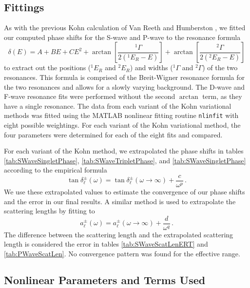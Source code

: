 \documentclass[preprint,showpacs,preprintnumbers,amsmath,amssymb]{revtex4}
\begin{document}
\subsection{Fittings}
As with the previous Kohn calculation of Van Reeth and Humberston \cite{VanReeth2004}, we fitted our computed phase shifts for the S-wave and P-wave to the resonance formula
\begin{equation}
\label{eq:ResonanceFit}
\delta(E) = A + B E + C E^2 + \arctan \left[ \frac{^1\Gamma}{2(^1E_R - E)} \right] + \arctan \left[ \frac{^2\Gamma}{2(^2E_R - E)} \right]
\end{equation}
to extract out the positions ($^1E_R$ and $^2E_R$) and widths
($^1\Gamma$ and $^2\Gamma$) of the two resonances. 
This formula is comprised of the Breit-Wigner resonance
formula for the two resonances and allows for a slowly varying
background. The D-wave and F-wave resonance fits were performed without the second $\arctan$ term, as they have a single resonance. 
The data from each variant of the Kohn variational methods was fitted using the MATLAB nonlinear fitting routine \texttt{nlinfit} with eight possible weightings.
For each variant of the Kohn variational method, the four parameters were determined for each of the eight fits and compared.

For each variant of the Kohn method, we extrapolated the phase shifts in tables \ref{tab:SWaveSingletPhase}, \ref{tab:SWaveTripletPhase}, and \ref{tab:SWaveSingletPhase} according to the empirical formula \cite{VanReeth2003}
\begin{equation}
\label{eq:Extrap}
\tan\delta_\ell^\pm(\omega) = \tan\delta_\ell^\pm(\omega\to\infty) + \frac{c}{\omega^p}\, .
\end{equation}
We use these extrapolated values to estimate the convergence of our phase shifts and the error in our final results.
A similar method is used to extrapolate the scattering lengths by fitting to
\begin{equation}
\label{eq:ExtrapA}
a_\ell^\pm(\omega) = a_\ell^\pm(\omega\to\infty) + \frac{d}{\omega^q}\, .
\end{equation}
The difference between the scattering length and the extrapolated scattering length is considered the error in tables \ref{tab:SWaveScatLenERT} and \ref{tab:PWaveScatLen}. No convergence pattern was found for the effective range.


\subsection{Nonlinear Parameters and Terms Used}
\label{sec:Parameters}
\end{document}
